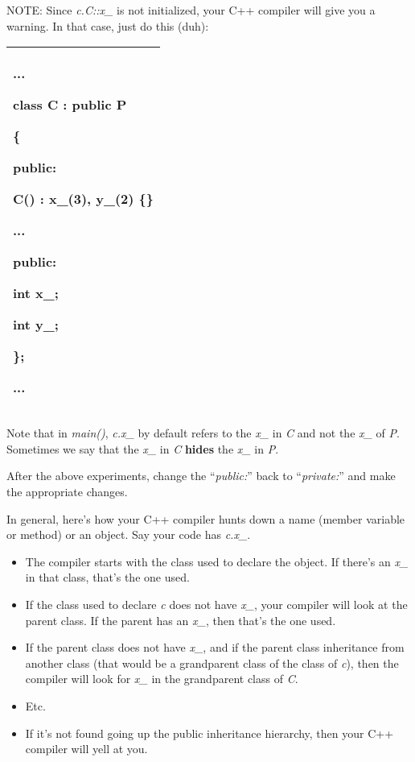 \documentclass[
]{article}
\providecommand{\tightlist}{%
  \setlength{\itemsep}{0pt}\setlength{\parskip}{0pt}}
\begin{document}
NOTE: Since \emph{c.C::x\_} is not initialized, your C++ compiler will
give you a warning. In that case, just do this (duh):

\begin{longtable}[]{@{}l@{}}
\toprule
\endhead
\begin{minipage}[t]{0.97\columnwidth}\raggedright
...

class C : public P

\{

public:

C() : \textbf{x\_(3), }y\_(2) \{\}

...

public:

int x\_;

int y\_;

\};

...\strut
\end{minipage}\tabularnewline
\bottomrule
\end{longtable}

Note that in \emph{main()}, \emph{c.x\_} by default refers to the
\emph{x\_} in \emph{C} and not the \emph{x\_} of \emph{P}. Sometimes we
say that the \emph{x\_} in \emph{C} \textbf{hides} the \emph{x\_} in
\emph{P}.

After the above experiments, change the ``\emph{public:}'' back to
``\emph{private:}'' and make the appropriate changes.

In general, here's how your C++ compiler hunts down a name (member
variable or method) or an object. Say your code has \emph{c.x\_}.

\begin{itemize}
\tightlist
\item
  The compiler starts with the class used to declare the object. If
  there's an \emph{x\_} in that class, that's the one used.
\item
  If the class used to declare \emph{c} does not have \emph{x\_}, your
  compiler will look at the parent class. If the parent has an
  \emph{x\_}, then that's the one used.
\item
  If the parent class does not have \emph{x\_}, and if the parent class
  inheritance from another class (that would be a grandparent class of
  the class of \emph{c}), then the compiler will look for \emph{x\_} in
  the grandparent class of \emph{C}.
\item
  Etc.
\item
  If it's not found going up the public inheritance hierarchy, then your
  C++ compiler will yell at you.
\end{itemize}
\end{document}
